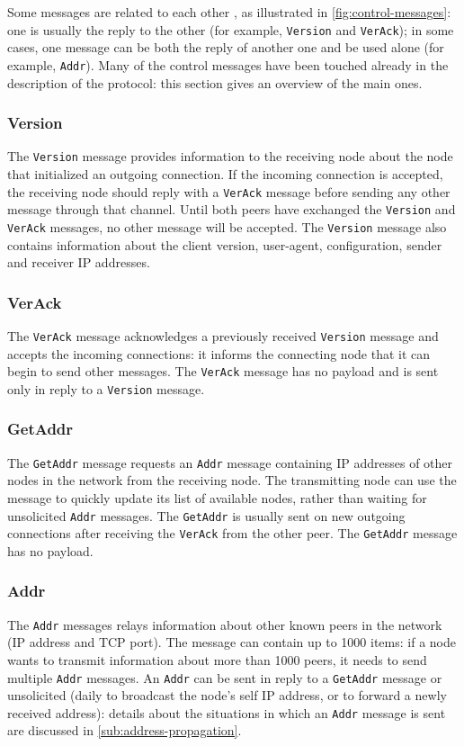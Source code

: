 Some messages are related to each other \cite{bitcoin_reference}, as illustrated in \cref{fig:control-messages}:
one is usually the reply to the other (for example, \texttt{Version} and \texttt{VerAck});
in some cases, one message can be both the reply of another one and be used alone (for example, \texttt{Addr}).
Many of the control messages have been touched already in the description of the protocol:
this section gives an overview of the main ones.

\subsubsection{Version}
\label{par:version}
The \texttt{Version} message provides information to the receiving node about the node that initialized an outgoing connection.
If the incoming connection is accepted, the receiving node should reply with a \texttt{VerAck} message before sending any other message through that channel.
Until both peers have exchanged the \texttt{Version} and \texttt{VerAck} messages, no other message will be accepted.
The \texttt{Version} message also contains information about the client version, user-agent, configuration, sender and receiver IP addresses.

\subsubsection{VerAck}
The \texttt{VerAck} message acknowledges a previously received \texttt{Version} message and accepts the incoming connections:
it informs the connecting node that it can begin to send other messages.
The \texttt{VerAck} message has no payload and is sent only in reply to a \texttt{Version} message.

\subsubsection{GetAddr}
The \texttt{GetAddr} message requests an \texttt{Addr} message containing IP addresses of other nodes in the network from the receiving node.
The transmitting node can use the message to quickly update its list of available nodes, rather than waiting for unsolicited \texttt{Addr} messages.
The \texttt{GetAddr} is usually sent on new outgoing connections after receiving the \texttt{VerAck} from the other peer.
The \texttt{GetAddr} message has no payload.

\subsubsection{Addr}
The \texttt{Addr} messages relays information about other known peers in the network (IP address and TCP port).
The message can contain up to \num{1000} items:
if a node wants to transmit information about more than \num{1000} peers, it needs to send multiple \texttt{Addr} messages.
An \texttt{Addr} can be sent in reply to a \texttt{GetAddr} message or unsolicited (daily to broadcast the node's self IP address, or to forward a newly received address):
details about the situations in which an \texttt{Addr} message is sent are discussed in \cref{sub:address-propagation}.

